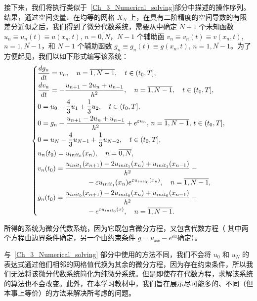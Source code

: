 \documentclass[twoside]{book}
\begin{document}
\begin{CJK*}{GBK}{song}
接下来，我们将执行类似于~\ref{Ch_3_Numerical_solving}部分中描述的操作序列。结果，通过空间变量、在均等的网格 $X_N$ 上，在具有二阶精度的空间导数的有限差分近似之后，我们得到了微分代数系统，需要从中确定 $N + 1$ 个未知函数 $u_{n} \equiv  u_{n}(t) \equiv u(x_n,t)$, $n = \overline{0,N}$，$N - 1$ 个辅助函 $v_{n} \equiv  v_{n}(t) \equiv v(x_n,t)$, $n = \overline{1,N - 1}$，和 $N - 1$ 个辅助函数 $g_{n} \equiv  g_{n}(t) \equiv g(x_n,t)$, $n = \overline{1,N - 1}$。为了方便起见，我们以如下形式编写该系统：
\begin{equation*}
    \left\{
    \begin{aligned}
        &\dfrac{d g_n}{d t} = v_n, \quad n = \overline{1,N - 1}, \quad t \in (t_0,T], \\
        &\dfrac{d v_n}{dt} = -\frac{u_{n + 1} - 2u_n + u_{n - 1}}{h^2}, \quad n = \overline{1,N - 1}, \quad t \in (t_0,T], \\
        &0 = u_0 - \frac{4}{3}u_1 + \frac{1}{3}u_2, \quad t \in (t_0,T],\\
        &0 = g_n - \frac{u_{n + 1} - 2u_n + u_{n - 1}}{h^2} + e^{\varepsilon u_n}, \, n = \overline{1,N - 1}, \, t \in (t_0,T], \\
        &0 = u_N - \frac{4}{3}u_{N - 1} + \frac{1}{3}u_{N - 2}, \quad t \in (t_0,T],\\
        &u_n(t_0) = u_{init_0}(x_n), \quad n = \overline{0,N},\\
        &v_n(t_0) = \frac{u_{init_1}(x_{n + 1}) - 2u_{init_1}(x_n) + u_{init_1}(x_{n - 1})}{h^2} - {}\\
        &\hspace{2.5cm} - \varepsilon u_{init_1}(x_n) e^{\varepsilon u_{init_0}(x_n)}, \quad n = \overline{1,N - 1},\\
        &g_n(t_0) = \frac{u_{init_0}(x_{n + 1}) - 2u_{init_0}(x_n) + u_{init_0}(x_{n - 1})}{h^2} - {}\\
        &\hspace{2.5cm} - e^{\varepsilon u_{init_0}(x)}, \quad n = \overline{1,N - 1}.
    \end{aligned}
    \right.
\end{equation*}

所得的系统为微分代数系统，因为它既包含微分方程，又包含代数方程（ 其中两个方程由边界条件确定，另一个由约束条件 $g = u_{xx} - e^{\varepsilon u}$确定）。

与~\ref{Ch_3_Numerical_solving} 部分中使用的方法不同，我们不会将 $u_0$ 和 $u_N$ 的表达式通过他们相邻的网格值代换为其余的微分方程，因为存在约束条件，所以我们无法将该微分代数系统简化为纯微分系统。但是即使存在代数方程，求解该系统的算法也不会改变。此外，在本学习教材中，我们旨在展示尽可能多的、不同（但本事上等价）的方法来解决所考虑的问题。


\end{CJK*}
\end{document}
